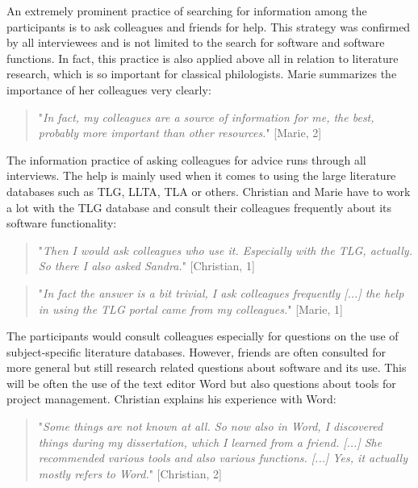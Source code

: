 \documentclass[12pt, a4paper, titlepage, oneside, abstract=true, toc=listof, toc=bibliography, BCOR=1cm]{scrreprt}
\begin{document}
{%
An extremely prominent practice of searching for information among the participants is to ask colleagues and friends for help. This strategy was confirmed by all interviewees and is not limited to the search for software and software functions. In fact, this practice is also applied above all in relation to literature research, which is so important for classical philologists. Marie summarizes the importance of her colleagues very clearly: 

\begin{quotation}
"\textit{In fact, my colleagues are a source of information for me, the best, probably more important than other resources.}" [Marie, 2]
\end{quotation}

The information practice of asking colleagues for advice runs through all interviews. The help is mainly used when it comes to using the large literature databases such as TLG, LLTA, TLA or others. Christian and Marie have to work a lot with the TLG database and consult their colleagues frequently about its software functionality: 

\begin{quotation}
"\textit{Then I would ask colleagues who use it. Especially with the TLG, actually. So there I also asked Sandra.}" [Christian, 1]
\end{quotation}

\begin{quotation}
"\textit{In fact the answer is a bit trivial, I ask colleagues frequently [...]  the help in using the TLG portal came from my colleagues.}" [Marie, 1]
\end{quotation}

The participants would consult colleagues especially for questions on the use of subject-specific literature databases. 
However, friends are often consulted for more general but still research related questions about software and its use. This will be often the use of the text editor Word but also questions about tools for project management. Christian explains his experience with Word:

\begin{quotation}
"\textit{Some things are not known at all. So now also in Word, I discovered things during my dissertation, which I learned from a friend. [...] She recommended various tools and also various functions. [...] Yes, it actually mostly refers to Word.}" [Christian, 2]
\end{quotation}

}
\end{document}
